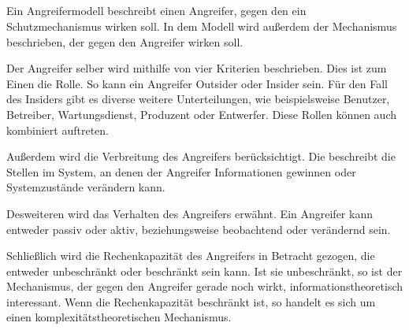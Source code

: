 \documentclass[ngerman]{fbi-aufgabenblatt}
\begin{document}
\setcounter{section}{2}


\subsection{}

Ein Angreifermodell beschreibt einen Angreifer, gegen den ein Schutzmechanismus wirken soll. In dem Modell wird außerdem der Mechanismus beschrieben, der gegen den Angreifer wirken soll.

Der Angreifer selber wird mithilfe von vier Kriterien beschrieben. Dies ist zum Einen die Rolle. So kann ein Angreifer Outsider oder Insider sein. Für den Fall des Insiders gibt es diverse weitere Unterteilungen, wie beispielsweise Benutzer, Betreiber, Wartungsdienst, Produzent oder Entwerfer. Diese Rollen können auch kombiniert auftreten.

Außerdem wird die Verbreitung des Angreifers berücksichtigt. Die beschreibt die Stellen im System, an denen der Angreifer Informationen gewinnen oder Systemzustände verändern kann.

Desweiteren wird das Verhalten des Angreifers erwähnt. Ein Angreifer kann entweder passiv oder aktiv, beziehungsweise beobachtend oder verändernd sein.

Schließlich wird die Rechenkapazität des Angreifers in Betracht gezogen, die entweder unbeschränkt oder beschränkt sein kann. Ist sie unbeschränkt, so ist der Mechanismus, der gegen den Angreifer gerade noch wirkt, informationstheoretisch interessant. Wenn die Rechenkapazität beschränkt ist, so handelt es sich um einen komplexitätstheoretischen Mechanismus.

%
\end{document}
